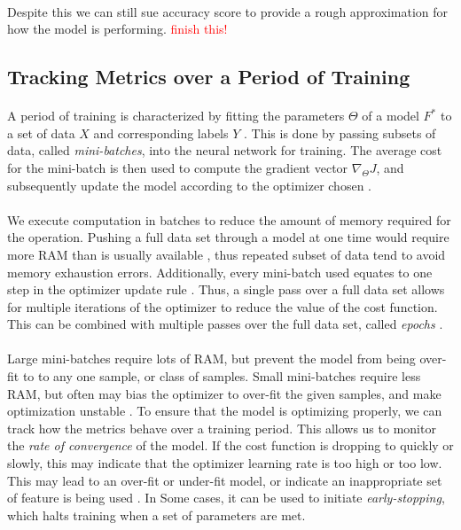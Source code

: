 \documentclass[12pt,letterpaper]{article}
\begin{document}
\paragraph*{}Despite this we can still sue accuracy score to provide a rough approximation for how the model is performing. \textcolor{red}{finish this!} 


\subsection{Tracking Metrics over a Period of Training}
\label{subsec-TrainingMetrics}

\paragraph*{}A period of training is characterized by fitting the parameters $\Theta$ of a model $F^*$ to a set of data $X$ and corresponding labels $Y$ \cite{Goodfellow,Virtanen}. This is done by passing subsets of data, called \textit{mini-batches}, into the neural network for training. The average cost for the mini-batch is then used to compute the gradient vector $\nabla_{\Theta}J$, and subsequently update the model according to the optimizer chosen \cite{Geron,Goodfellow}. 

\paragraph{}We execute computation in batches to reduce the amount of memory required for the operation. Pushing a full data set through a model at one time would require more RAM than is usually available , thus repeated subset of data tend to avoid memory exhaustion errors. Additionally, every mini-batch used equates to one step in the optimizer update rule \cite{Goodfellow}. Thus, a single pass over a full data set allows for multiple iterations of the optimizer to reduce the value of the cost function. This can be combined with multiple passes over the full data set, called \textit{epochs} \cite{James,Loy}.

\paragraph*{}Large mini-batches require lots of RAM, but prevent the model from being over-fit to to any one sample, or class of samples. Small mini-batches require less RAM, but often may bias the optimizer to over-fit the given samples, and make optimization unstable \cite{Geron,James}. To ensure that the model is optimizing properly, we can track how the metrics behave over a training period. This allows us to monitor the \textit{rate of convergence} of the model. If the cost function is dropping to quickly or slowly, this may indicate that the optimizer learning rate is too high or too low. This may lead to an over-fit or under-fit model, or indicate an inappropriate set of feature is being used \cite{Geron,Goodfellow}. In Some cases, it can be used to initiate \textit{early-stopping}, which halts training when a set of parameters are met. 
\end{document}
